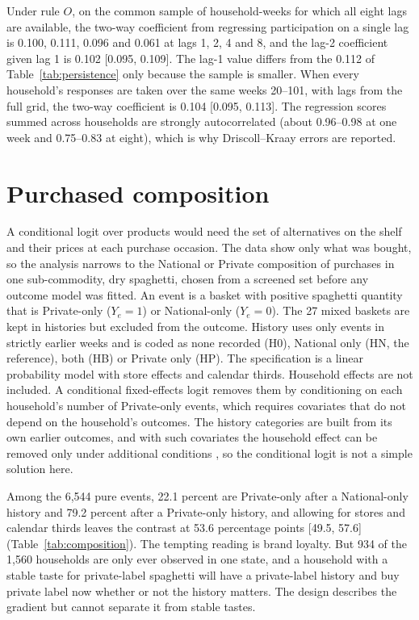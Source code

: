 \documentclass[11pt]{article}
\begin{document}
Under rule $O$, on the common sample of household-weeks for which all eight lags are
available, the two-way coefficient from regressing participation on a single lag is 0.100,
0.111, 0.096 and 0.061 at lags 1, 2, 4 and 8, and the lag-2 coefficient given lag 1 is 0.102
[0.095, 0.109]. The lag-1 value differs from the 0.112 of Table~\ref{tab:persistence} only
because the sample is smaller. When every household's responses are taken over the
same weeks 20--101, with lags from the full grid, the two-way coefficient is 0.104 [0.095,
0.113]. The regression scores summed
across households are strongly autocorrelated (about 0.96--0.98 at one week and 0.75--0.83 at
eight), which is why Driscoll--Kraay errors are reported.

\section{Purchased composition}
\label{app:composition}
\setcounter{table}{0}

A conditional logit over products would need the set of alternatives on the shelf and their prices
at each purchase occasion. The data show only what was bought, so the analysis narrows to the
National or Private composition of purchases in one sub-commodity, dry spaghetti, chosen from a
screened set before any outcome model was fitted. An event is a basket with positive spaghetti
quantity that is Private-only ($Y_e=1$) or National-only ($Y_e=0$). The 27 mixed baskets are kept in
histories but excluded from the outcome. History uses only events in strictly earlier weeks and is
coded as none recorded (H0), National only (HN, the reference), both (HB) or Private only (HP). The
specification is a linear probability model with store effects and calendar thirds. Household effects
are not included. A conditional fixed-effects logit removes them by conditioning on each household's
number of Private-only events, which requires covariates that do not depend on the household's
outcomes. The history categories are built from its own earlier outcomes, and with such covariates
the household effect can be removed only under additional conditions \citep{honore_kyriazidou}, so
the conditional logit is not a simple solution here.

Among the 6,544 pure events, 22.1 percent are Private-only after a National-only history and
79.2 percent after a Private-only history, and allowing for stores and calendar thirds leaves the
contrast at 53.6 percentage points [49.5, 57.6] (Table~\ref{tab:composition}). The tempting
reading is brand loyalty. But 934 of the 1,560 households are only ever observed in one state, and
a household with a stable taste for private-label spaghetti will have a private-label history and
buy private label now whether or not the history matters. The design describes the gradient but
cannot separate it from stable tastes.
\end{document}

